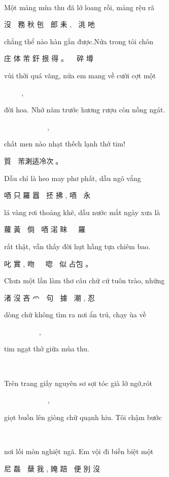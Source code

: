 \documentclass[14pt,a4paper]{extarticle}
\begin{document}
 𢚸 碎。\bigskip 

{\small  Một mảng mùa thu đã lở loang rồi, \hfill mảng rệu rã}
 
 沒 𥮎 務 秋 㐌 𡋿 郎 耒 , 𥮎 洮 吔 
 
{\small chẳng thể nào hàn gắn được.\hfill Nửa trong tôi chôn} 
 
庄  体 芾 釬  拫  得 。𡛤  𥪝   碎   墫  
 
{\small  vùi thời quá vãng, \hfill nửa em mang về cười cợt một}
 
 𣼯  時  过  往  ,  𡛤  㛪  芒  𧗱 唭𠹳  沒   \newpage 
 
{\small  đời hoa. \hfill Nhớ năm  trước hương rượu còn nồng ngát. }
 
 𠁀  花。𢖵  𢆥  𠓀  香  𤄍  群  濃  𠯪  ,  
 
 
{\small chất men nào nhạt thếch lạnh thớ tim!}

 質  𥽔 芾溂适冷次𦙦。\bigskip 
 
{\small  Dẫu chỉ là heo may phơ phất, \hfill dẫu ngõ vắng}

 唒 只 羅 囂 𩘄         抷 拂 , 唒 𨳱 永 
 
{\small   lá vàng rơi thoảng khẽ, dẫu nước mắt ngày xưa là}
 
 蘿 黃 𣑎 倘 𡃊 唒 渃    眜 𣈜 𠸗 羅 
 
{\small   rất thật, \hfill vẫn thấy đời hụt hẫng tựa chiêm bao. }

 叱 實 , 吻 𧡊 𠁀 唿 𠾿 似 占包 。
 
 
{\small Chưa một lần làm thơ câu chữ cứ tuôn trào, \hfill những}

渚    沒    吝    爫    𡮲    句    𡨸    據    𣻆    潮    ,    忍   
 

{\small  dòng chữ không tìm ra nơi ẩn trú, \hfill chạy ùa về }
 
  𣳔    𡨸    空  尋 𠚢 尼 住 隱 , 𧼋 咼 𧗱 
  
{\small tim ngạt thở giữa mùa thu. }

  𦙦 蘖 咀 𡨌 務 秋。

{\small Trên trang giấy nguyên sơ sợi tóc già lớ ngớ,\hfill  rót}


𨕭 庄 紙 元 初 𥾘 𩯀 𦓅 捛 𠽐 , 淬 

{\small  giọt buồn lên giòng chữ quạnh hiu. \hfill 
Tôi chậm bước}
 

𠸂 𢞂 𨖲 𣳔 𡨸    𣔲    咻    。碎    踸    𨀈    

{\small  nơi lối mòn nghiệt ngã. Em vội đi biền biệt một}


尼    磊    𤷱    蘖    我    ,    㛪    踣    𠫾    便 別    沒    
\end{document}
